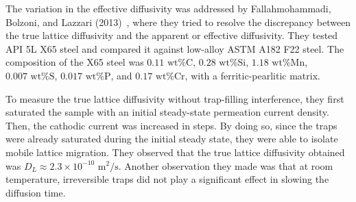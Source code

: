 \documentclass[a4paper,12pt,oneside]{report}
\begin{document}
The variation in the effective diffusivity was addressed by Fallahmohammadi, Bolzoni, and Lazzari (2013)~\cite{Fallahmohammadi2013}, where they tried to resolve the discrepancy between the true lattice diffusivity and the apparent or effective diffusivity. They tested API 5L X65 steel and compared it against low-alloy ASTM A182 F22 steel. The composition of the X65 steel was $0.11\text{ wt\% C}$, $0.28\text{ wt\% Si}$, $1.18\text{ wt\% Mn}$, $0.007\text{ wt\% S}$, $0.017\text{ wt\% P}$, and $0.17\text{ wt\% Cr}$, with a ferritic-pearlitic matrix.

To measure the true lattice diffusivity without trap-filling interference, they first saturated the sample with an initial steady-state permeation current density. Then, the cathodic current was increased in steps. By doing so, since the traps were already saturated during the initial steady state, they were able to isolate mobile lattice migration. They observed that the true lattice diffusivity obtained was $D_L \approx 2.3 \times 10^{-10} \text{ m}^2/\text{s}$. Another observation they made was that at room temperature, irreversible traps did not play a significant effect in slowing the diffusion time.
\end{document}
